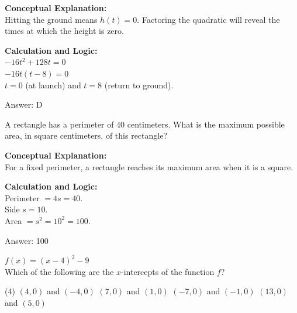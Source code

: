 \documentclass[11pt,paper=a4,answers]{exam}
\begin{document}
\begin{questions}
\begin{solution}
\textbf{Conceptual Explanation:} \\
Hitting the ground means $h(t) = 0$. Factoring the quadratic will reveal the times at which the height is zero.

\vspace{20pt}

\textbf{Calculation and Logic:} \\
$-16t^2 + 128t = 0$ \\
$-16t(t - 8) = 0$ \\
$t = 0$ (at launch) and $t = 8$ (return to ground).

\vspace{25pt}

Answer: \colorbox{yellow!100}{D}
\end{solution}

\vspace{40pt}

\question
A rectangle has a perimeter of 40 centimeters. What is the maximum possible area, in square centimeters, of this rectangle?

\begin{solution}
\textbf{Conceptual Explanation:} \\
For a fixed perimeter, a rectangle reaches its maximum area when it is a square.

\vspace{20pt}

\textbf{Calculation and Logic:} \\
Perimeter $= 4s = 40$. \\
Side $s = 10$. \\
Area $= s^2 = 10^2 = 100$.

\vspace{25pt}

Answer: \colorbox{yellow!100}{100}
\end{solution}

\vspace{40pt}

\question
$f(x) = (x-4)^2 - 9$ \\
Which of the following are the $x$-intercepts of the function $f$?
\begin{tasks}(4)
    \task $(4, 0)$ and $(-4, 0)$
    \task $(7, 0)$ and $(1, 0)$
    \task $(-7, 0)$ and $(-1, 0)$
    \task $(13, 0)$ and $(5, 0)$
\end{tasks}


\end{questions}
\end{document}
